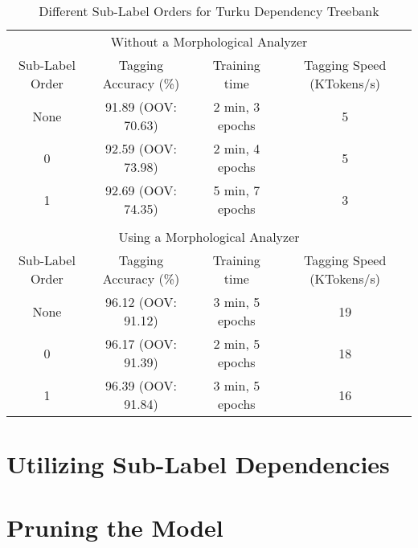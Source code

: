 \begin{table}[htb!]
\begin{center}
\begin{tabular}{cccc}
\multicolumn{4}{c}{Without a Morphological Analyzer}\\
Sub-Label Order & Tagging Accuracy (\%) & Training time    & Tagging Speed (KTokens/s)\\
\hline
None            & 91.89 (OOV: 70.63)    & 2 min, 3 epochs  & 5                       \\
0               &  92.59 (OOV: 73.98)   & 2 min, 4 epochs  & 5                       \\
1               &  92.69 (OOV: 74.35)   & 5 min, 7 epochs  & 3                       \\
\hline
                &                       &                  &                          \\
\multicolumn{4}{c}{Using a Morphological Analyzer}\\
Sub-Label Order & Tagging Accuracy (\%) & Training time    & Tagging Speed (KTokens/s)\\
\hline
None            &  96.12 (OOV: 91.12)   & 3 min, 5 epochs  & 19                       \\
0               &  96.17 (OOV: 91.39)   & 2 min, 5 epochs  & 18                       \\
1               &  96.39 (OOV: 91.84)   & 3 min, 5 epochs  & 16                       \\
\hline
\end{tabular}
\caption{Different Sub-Label Orders for Turku Dependency Treebank}
\end{center}
\end{table}

\section{Utilizing Sub-Label Dependencies}

\section{Pruning the Model}


